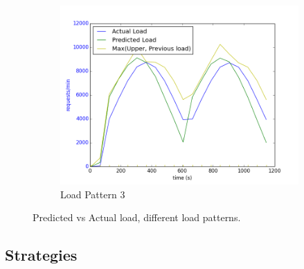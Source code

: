 \documentclass[12pt]{article}
\begin{document}
\begin{figure}[h!]
\begin{subfigure}{.6\textwidth}
\includegraphics[width=\textwidth]{Smart382predictedVsActual.png}
\caption{Load Pattern 3}
\end{subfigure}
\caption{Predicted vs Actual load, different load patterns.}
\label{loadsss}
\end{figure}

\subsection{Strategies}


\end{document}
